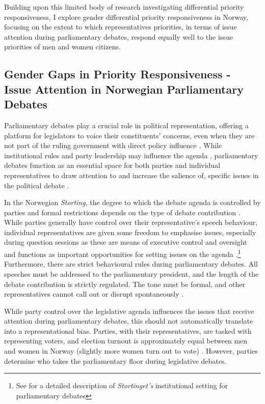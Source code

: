 Building upon this limited body of research investigating differential priority responsiveness, I explore gender differential priority responsiveness in Norway, focusing on the extent to which representatives priorities, in terms of issue attention during parliamentary debates, respond equally well to the issue priorities of men and women citizens.

\subsection*{Gender Gaps in Priority Responsiveness - Issue Attention in Norwegian Parliamentary Debates}

Parliamentary debates play a crucial role in political representation, offering a platform for legislators to voice their constituents' concerns, even when they are not part of the ruling government with direct policy influence \parencite{slapin_introduction_2014}. While institutional rules and party leadership may influence the agenda \parencite{slapin_modeling_2014}, parliamentary debates function as an essential space for both parties and individual representatives to draw attention to and increase the salience of, specific issues in the political debate \parencite{ivanusch_issue_nodate, debus_manifestation_2021}. 

In the Norwegian \textit{Storting}, the degree to which the debate agenda is controlled by parties and formal restrictions depends on the type of debate contribution \parencite{soyland_norway_2021}. While parties generally have control over their representative's speech behaviour, individual representatives are given some freedom to emphasise issues, especially during question sessions as these are means of executive control and oversight and functions as important opportunities for setting issues on the agenda \parencite{soyland_party_2019, rasch_behavioural_2011}.\footnote{See \parencite{soyland_norway_2021} for a detailed description of \textit{Stortinget's} institutional setting for parliamentary debates} Furthermore, there are strict behavioural rules during parliamentary debates. All speeches must be addressed to the parliamentary president, and the length of the debate contribution is strictly regulated. The tone must be formal, and other representatives cannot call out or disrupt spontaneously \parencite{soyland_party_2019}.

While party control over the legislative agenda influences the issues that receive attention during parliamentary debates, this should not automatically translate into a representational bias. Parties, with their representatives, are tasked with representing voters, and election turnout is approximately equal between men and women in Norway (slightly more women turn out to vote) \parencite{noauthor_ssbno_2021}. However, parties determine who takes the parliamentary floor during legislative debates. 

